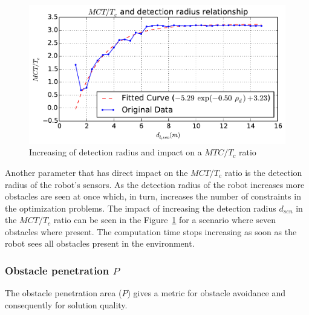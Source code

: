 \documentclass[eprint]{actapoly}
\begin{document}
\begin{figure}[!h]\centering
  \includegraphics[width=\linewidth]{./images/drho/drho-rmp.pdf} %
  \caption{Increasing of detection radius and impact on a $MTC/T_c$ 
ratio\label{fig:drhormp}}
\end{figure}
Another parameter that has direct impact on the $MCT/T_c$ ratio is the detection radius
of the robot's sensors.
As the detection radius of the robot increases more obstacles are
seen at once which, in turn,
increases the number of constraints in the optimization problems.
The impact of increasing the detection radius $d_{sen}$ in the $MCT/T_c$ ratio can
be seen in the Figure~\ref{fig:drhormp} for a scenario where seven obstacles where present.
The computation time stops increasing as soon as the robot sees all obstacles present in the environment.



\subsubsection{Obstacle penetration $P$}

The obstacle penetration area ($P$) gives a metric for obstacle avoidance and 
consequently for solution quality.
\end{document}
